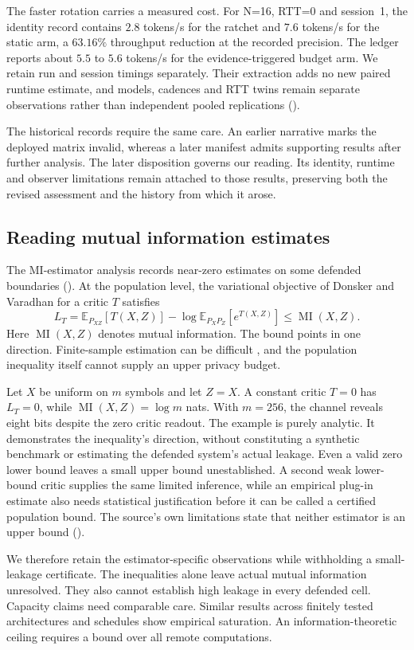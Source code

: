The faster rotation carries a measured cost. For N=16, RTT=0 and session~1,
the identity record contains $2.8$ tokens/s for the ratchet and $7.6$
tokens/s for the static arm, a $63.16\%$ throughput reduction at the
recorded precision. The ledger reports about $5.5$ to $5.6$ tokens/s for
the evidence-triggered budget arm. We retain run and session
timings separately. Their extraction adds no new paired runtime estimate,
and models, cadences and RTT twins remain separate observations rather
than independent pooled replications ().

The historical records require the same care. An earlier narrative marks
the deployed matrix invalid, whereas a later manifest admits supporting
results after further analysis. The later disposition governs our reading.
Its identity, runtime and observer limitations remain attached to those
results, preserving both the revised assessment and the history from
which it arose.

\subsection{Reading mutual information estimates}

The MI-estimator analysis records near-zero estimates on some defended
boundaries (). At the population level, the variational
objective of Donsker and Varadhan for a critic $T$ satisfies
\begin{equation}
 L_T=\mathbb E_{P_{XZ}}[T(X,Z)]-
 \log\mathbb E_{P_XP_Z}[e^{T(X,Z)}]\le \operatorname{MI}(X,Z).
 \label{eq:dv}
\end{equation}
Here $\operatorname{MI}(X,Z)$ denotes mutual information. The bound points
in one direction. Finite-sample estimation can be difficult
\citep{song2020,mcallester2020}, and the population inequality itself
cannot supply an upper privacy budget.

Let $X$ be uniform on $m$ symbols and let $Z=X$. A constant critic $T=0$
has $L_T=0$, while $\operatorname{MI}(X,Z)=\log m$ nats. With $m=256$,
the channel reveals eight bits despite the zero critic readout. The example
is purely analytic. It demonstrates the inequality's direction, without
constituting a synthetic benchmark or estimating the defended system's
actual leakage. Even a valid zero lower bound leaves a small upper bound
unestablished. A second weak lower-bound critic supplies the same limited
inference, while an empirical plug-in estimate also needs statistical
justification before it can be called a certified population bound. The
source's own limitations state that neither estimator is an upper bound
().

We therefore retain the estimator-specific observations while withholding
a small-leakage certificate. The inequalities alone leave actual mutual
information unresolved. They also cannot establish high leakage in every
defended cell. Capacity claims need comparable care.
Similar results across finitely tested architectures and schedules show
empirical saturation. An information-theoretic ceiling requires a bound
over all remote computations.
